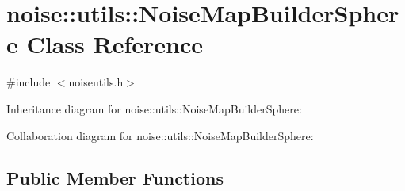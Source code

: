 \hypertarget{classnoise_1_1utils_1_1_noise_map_builder_sphere}{\section{noise\+:\+:utils\+:\+:Noise\+Map\+Builder\+Sphere Class Reference}
\label{classnoise_1_1utils_1_1_noise_map_builder_sphere}
}


{\ttfamily \#include $<$noiseutils.\+h$>$}



Inheritance diagram for noise\+:\+:utils\+:\+:Noise\+Map\+Builder\+Sphere\+:


Collaboration diagram for noise\+:\+:utils\+:\+:Noise\+Map\+Builder\+Sphere\+:
\subsection*{Public Member Functions}

